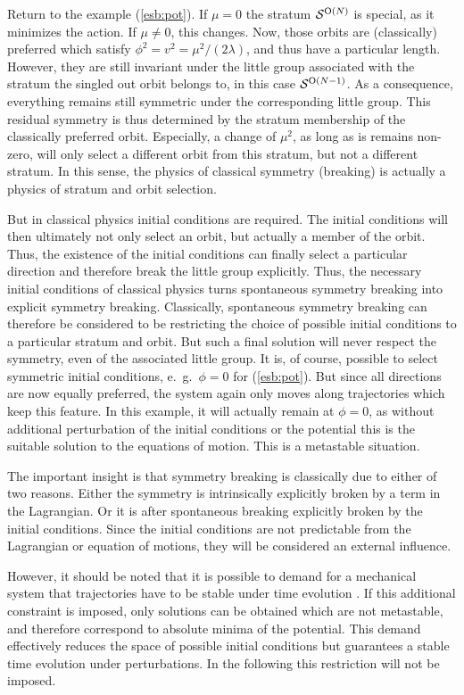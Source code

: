\documentclass[final,12pt]{article}
\newcommand*{\pref}[1]{(\ref{#1})}
\newcommand*{\1}{1\!\!\!\bot}
\begin{document}
Return to the example \pref{esb:pot}. If $\mu=0$ the stratum ${\cal S}^{\text{O}(N)}$ is special, as it minimizes the action. If $\mu\neq 0$, this changes. Now, those orbits are (classically) preferred which satisfy $\phi^2=v^2=\mu^2/(2\lambda)$, and thus have a particular length. However, they are still invariant under the little group associated with the stratum the singled out orbit belongs to, in this case ${\cal S}^{\text{O}(N-1)}$. As a consequence, everything remains still symmetric under the corresponding little group. This residual symmetry is thus determined by the stratum membership of the classically preferred orbit. Especially, a change of $\mu^2$, as long as is remains non-zero, will only select a different orbit from this stratum, but not a different stratum. In this sense, the physics of classical symmetry (breaking) is actually a physics of stratum and orbit selection.

But in classical physics initial conditions are required. The initial conditions will then ultimately not only select an orbit, but actually a member of the orbit. Thus, the existence of the initial conditions can finally select a particular direction and therefore break the little group explicitly. Thus, the necessary initial conditions of classical physics turns spontaneous symmetry breaking into explicit symmetry breaking. Classically, spontaneous symmetry breaking can therefore be considered to be restricting the choice of possible initial conditions to a particular stratum and orbit. But such a final solution will never respect the symmetry, even of the associated little group. It is, of course, possible to select symmetric initial conditions, e.\ g.\ $\phi=0$ for \pref{esb:pot}. But since all directions are now equally preferred, the system again only moves along trajectories which keep this feature. In this example, it will actually remain at $\phi=0$, as without additional perturbation of the initial conditions or the potential this is the suitable solution to the equations of motion. This is a metastable situation.

The important insight is that symmetry breaking is classically due to either of two reasons. Either the symmetry is intrinsically explicitly broken by a term in the Lagrangian. Or it is after spontaneous breaking explicitly broken by the initial conditions. Since the initial conditions are not predictable from the Lagrangian or equation of motions, they will be considered an external influence.

However, it should be noted that it is possible to demand for a mechanical system that trajectories have to be stable under time evolution \cite{Strocchi:2005yk,Strocchi:2012ir}. If this additional constraint is imposed, only solutions can be obtained which are not metastable, and therefore correspond to absolute minima of the potential. This demand effectively reduces the space of possible initial conditions but guarantees a stable time evolution under perturbations. In the following this restriction will not be imposed.
\end{document}
